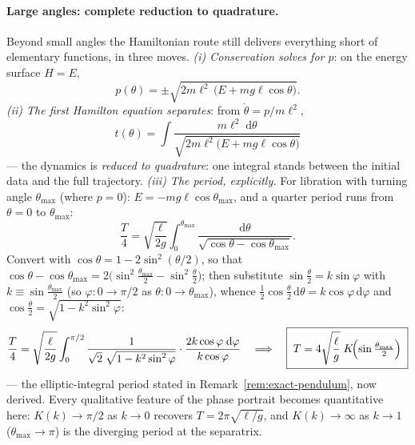 \documentclass[11pt]{article}
\theoremstyle{plain}
\theoremstyle{definition}
\theoremstyle{remark}
\newcommand{\dd}{\mathrm{d}}
\begin{document}
\paragraph{Large angles: complete reduction to quadrature.}
Beyond small angles the Hamiltonian route still delivers everything short
of elementary functions, in three moves. \emph{(i) Conservation solves
for $p$}: on the energy surface $H = E$,
\begin{equation}
  p(\theta) = \pm\sqrt{2m\ell^2\,\bigl(E + mg\ell\cos\theta\bigr)} .
\end{equation}
\emph{(ii) The first Hamilton equation separates}: from
$\dot\theta = p/m\ell^2$,
\begin{equation}
  t(\theta) = \int \frac{m\ell^2\;\dd\theta}
  {\sqrt{2m\ell^2\bigl(E + mg\ell\cos\theta\bigr)}}
  \label{eq:pendulum-quadrature}
\end{equation}
--- the dynamics is \emph{reduced to quadrature}: one integral stands
between the initial data and the full trajectory. \emph{(iii) The period,
explicitly.} For libration with turning angle $\theta_{\max}$ (where
$p = 0$): $E = -mg\ell\cos\theta_{\max}$, and a quarter period runs from
$\theta = 0$ to $\theta_{\max}$:
\begin{equation}
  \frac{T}{4}
  = \sqrt{\frac{\ell}{2g}} \int_0^{\theta_{\max}}
  \frac{\dd\theta}{\sqrt{\cos\theta - \cos\theta_{\max}}} .
\end{equation}
Convert with $\cos\theta = 1 - 2\sin^2(\theta/2)$, so that
$\cos\theta - \cos\theta_{\max}
= 2\bigl(\sin^2\tfrac{\theta_{\max}}{2} - \sin^2\tfrac{\theta}{2}\bigr)$;
then substitute $\sin\tfrac{\theta}{2} = k\sin\varphi$ with
$k \equiv \sin\tfrac{\theta_{\max}}{2}$ (so $\varphi: 0 \to \pi/2$ as
$\theta: 0 \to \theta_{\max}$), whence
$\tfrac12\cos\tfrac{\theta}{2}\,\dd\theta = k\cos\varphi\,\dd\varphi$ and
$\cos\tfrac{\theta}{2} = \sqrt{1 - k^2\sin^2\varphi}$:
\begin{equation}
  \frac{T}{4}
  = \sqrt{\frac{\ell}{2g}}\int_0^{\pi/2}
  \frac{1}{\sqrt{2}\;\sqrt{1 - k^2\sin^2\varphi}}\cdot
  \frac{2k\cos\varphi\;\dd\varphi}{k\cos\varphi}
  \quad\Longrightarrow\quad
  \boxed{\;
  T = 4\sqrt{\frac{\ell}{g}}\;K\!\Bigl(\sin\tfrac{\theta_{\max}}{2}\Bigr)
  \;}
\end{equation}
--- the elliptic-integral period stated in
Remark~\ref{rem:exact-pendulum}, now derived. Every qualitative feature
of the phase portrait becomes quantitative here: $K(k) \to \pi/2$ as
$k \to 0$ recovers $T = 2\pi\sqrt{\ell/g}$, and $K(k) \to \infty$ as
$k \to 1$ ($\theta_{\max}\to\pi$) is the diverging period at the
separatrix.
\end{document}
